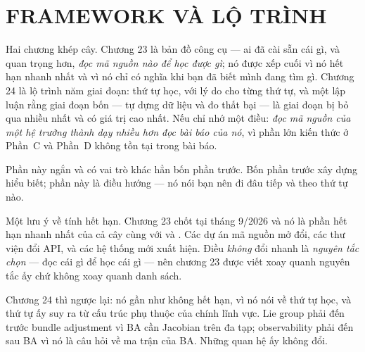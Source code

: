 \documentclass[../vslam.tex]{subfiles}
\begin{document}
\part{FRAMEWORK VÀ LỘ TRÌNH}
\begin{tomtat}
Hai chương khép cây. Chương 23 là bản đồ công cụ --- ai đã cài sẵn cái gì, và quan trọng hơn, \emph{đọc mã nguồn nào để học được gì}; nó được xếp cuối vì nó hết hạn nhanh nhất và vì nó chỉ có nghĩa khi bạn đã biết mình đang tìm gì. Chương 24 là lộ trình năm giai đoạn: thứ tự học, với lý do cho từng thứ tự, và một lập luận rằng giai đoạn bốn --- tự dựng dữ liệu và đo thất bại --- là giai đoạn bị bỏ qua nhiều nhất và có giá trị cao nhất. Nếu chỉ nhớ một điều: \emph{đọc mã nguồn của một hệ trưởng thành dạy nhiều hơn đọc bài báo của nó}, vì phần lớn kiến thức ở Phần~C và Phần~D không tồn tại trong bài báo.
\end{tomtat}

Phần này ngắn và có vai trò khác hẳn bốn phần trước. Bốn phần trước xây dựng hiểu biết; phần này là điều hướng --- nó nói bạn nên đi đâu tiếp và theo thứ tự nào.

Một lưu ý về tính hết hạn. Chương 23 chốt tại tháng 9/2026 và nó là phần hết hạn nhanh nhất của cả cây cùng với  và . Các dự án mã nguồn mở đổi, các thư viện đổi API, và các hệ thống mới xuất hiện. Điều \emph{không} đổi nhanh là \emph{nguyên tắc chọn} --- đọc cái gì để học cái gì --- nên chương 23 được viết xoay quanh nguyên tắc ấy chứ không xoay quanh danh sách.

Chương 24 thì ngược lại: nó gần như không hết hạn, vì nó nói về thứ tự học, và thứ tự ấy suy ra từ cấu trúc phụ thuộc của chính lĩnh vực. Lie group phải đến trước bundle adjustment vì BA cần Jacobian trên đa tạp; observability phải đến sau BA vì nó là câu hỏi về ma trận của BA. Những quan hệ ấy không đổi.



\ifSubfilesClassLoaded{\printbibliography[title={Nguồn}]}{}
\end{document}
